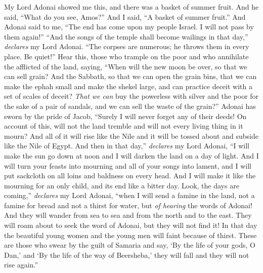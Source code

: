 \begin{biblechapter} %
 My Lord Adonai showed me this, and there was a basket of summer fruit.
\verse And he said, “What do you see, Amos?” And I said, “A basket of summer fruit.” And Adonai said to me, “The end has come upon my people Israel. I will not pass by them again!”
\verse “And the songs of the temple shall become wailings in that day,” \textit{declares} my Lord Adonai. “The corpses are numerous; he throws them in every place. Be quiet!”
\verse Hear this, those who trample on the poor and who annihilate the afflicted of the land,
\verse saying, “When will the new moon be over, so that we can sell grain? And the Sabbath, so that we can open the grain bins, that we can make the ephah small and make the shekel large, and can practice deceit with a set of scales of deceit?
\verse \textit{That we can} buy the powerless with silver and the poor for the sake of a pair of sandals, and we can sell the waste of the grain?”
\verse Adonai has sworn by the pride of Jacob, “Surely I will never forget any of their deeds!
\verse On account of this, will not the land tremble and will not every living thing in it mourn? And all of it will rise like the Nile and it will be tossed about and subside like the Nile of Egypt.
\verse And then in that day,” \textit{declares} my Lord Adonai, “I will make the sun go down at noon and I will darken the land on a day of light.
\verse And I will turn your feasts into mourning and all of your songs into lament, and I will put sackcloth on all loins and baldness on every head. And I will make it like the mourning for an only child, and its end like a bitter day.
\verse Look, the days are coming,” \textit{declares} my Lord Adonai, “when I will send a famine in the land, not a famine for bread and not a thirst for water, but \textit{of hearing} the words of Adonai!
\verse And they will wander from sea to sea and from the north and to the east. They will roam about to seek the word of Adonai, but they will not find it!
\verse In that day the beautiful young women and the young men will faint because of thirst.
\verse These are those who swear by the guilt of Samaria and say, ‘By the life of your gods, O Dan,’ and ‘By the life of the way of Beersheba,’ they will fall and they will not rise again.”
\end{biblechapter}

